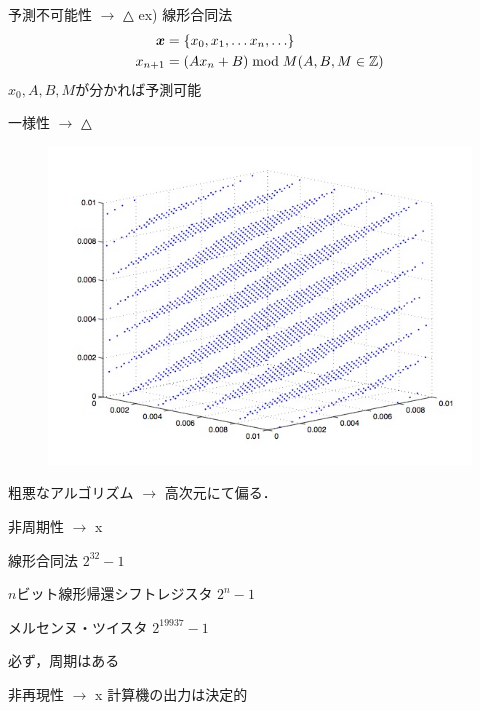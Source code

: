 \documentclass[dvipdfmx,xcolor={svgnames},17pt]{beamer}
\def\vector#1{\mbox{\boldmath $#1$}}
\begin{document}
    \begin{frame}{予測不可能性 $\rightarrow$ △}
      ex) 線形合同法
      \begin{align}
        \vector{x} &= \{x_0,x_1,\ldots x_n, \ldots\} \\
        x_{n+1} &= (Ax_n + B) \bmod M (A,B,M \in \mathbb{Z})
      \end{align}
      $x_0,A,B,M$が分かれば予測可能
    \end{frame}

      \begin{frame}{一様性 $\rightarrow$ △}
        \begin{figure}[htbp]
          \includegraphics[scale=0.3]{lcm.jpg}
        \end{figure}
        粗悪なアルゴリズム $\rightarrow$ 高次元にて偏る．
      \end{frame}

      \begin{frame}{非周期性 $\rightarrow$ x}
        \begin{block}{線形合同法}
          $2^{32} - 1$
        \end{block}
        \begin{block}{$n$ビット線形帰還シフトレジスタ}
          $2^n - 1$
        \end{block}
        \begin{block}{メルセンヌ・ツイスタ}
          $2^{19937} - 1$
        \end{block}
        必ず，周期はある
      \end{frame}

      \begin{frame}{非再現性 $\rightarrow$ x}
        計算機の出力は決定的
      \end{frame}
\end{document}
